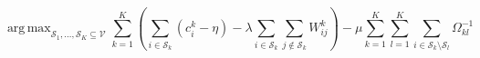 \documentclass[12pt,a4paper]{article}
\newcommand{\sset}{\mathcal{S}}
\newcommand{\vset}{\mathcal{V}}
\DeclareMathOperator*{\argmax}{arg\,max}
\begin{document}


\begin{equation}
\argmax_{\sset_1, \dots, \sset_K \subseteq \vset } \sum_{k=1}^K \left ( \sum_{i \in \sset_k} (c_i^k - \eta)
- \lambda \sum_{i \in \sset_k} \sum_{j \notin \sset_k} W_{ij}^k \right )
- \mu \sum_{k=1}^K \sum_{l=1}^K \sum_{i \in \sset_k \setminus \sset_l} \Omega_{kl}^{-1}
\label{eq:msfan}
\end{equation}



\end{document}
